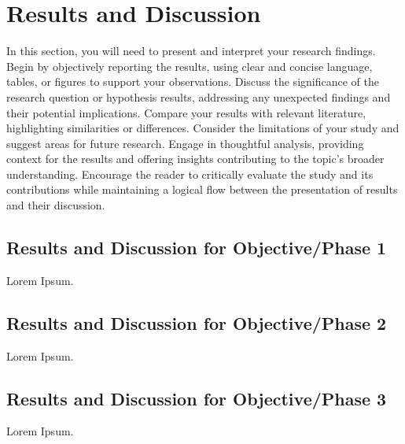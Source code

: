 
\renewcommand{\thechapter}{\Roman{chapter}}
\chapter{Results and Discussion}
    \thispagestyle{empty} 
    \renewcommand{\thechapter}{\arabic{chapter}}

    In this section, you will need to present and interpret your research findings. Begin by objectively reporting the results, using clear and concise language, tables, or figures to support your observations. Discuss the significance of the research question or hypothesis results, addressing any unexpected findings and their potential implications. Compare your results with relevant literature, highlighting similarities or differences. Consider the limitations of your study and suggest areas for future research. Engage in thoughtful analysis, providing context for the results and offering insights contributing to the topic's broader understanding. Encourage the reader to critically evaluate the study and its contributions while maintaining a logical flow between the presentation of results and their discussion. 

\section{Results and Discussion for Objective/Phase 1}
    Lorem Ipsum.

\section{Results and Discussion for Objective/Phase 2}
    Lorem Ipsum.

\section{Results and Discussion for Objective/Phase 3}
    Lorem Ipsum.
